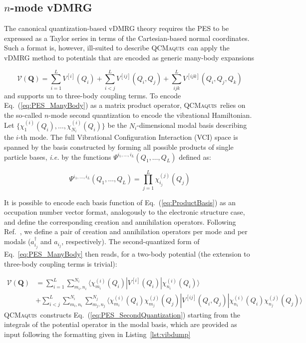 \documentclass[bibliography=totoc,12pt,a4paper]{scrartcl}
\newcommand{\qcm}{\textsc{QCMaquis}}
\begin{document}
\subsection{$n$-mode vDMRG}
\label{sec:nMode}

The canonical quantization-based vDMRG theory requires the PES to be expressed as a Taylor series in terms of the Cartesian-based normal coordinates.
Such a format is, however, ill-suited to describe
\qcm\ can apply the vDMRG method to potentials that are encoded as generic many-body expansions \cite{Bowman1997_ManyBody}

\begin{equation}
  \mathcal{V}(\bm{Q}) = \sum_{i=1}^L V^{[i]}(Q_i) + \sum_{i<j}^L V^{[ij]}(Q_i, Q_j)
    + \sum_{ijk}^L V^{[ijk]}(Q_i, Q_j, Q_k)
  \label{eq:PES_ManyBody}
\end{equation}
%
and supports un to three-body coupling terms.
To encode Eq.~(\ref{eq:PES_ManyBody}) as a matrix product operator, \qcm\ relies on the so-called $n$-mode second quantization \cite{Christiansen2004_nModeQuantization} to encode the vibrational Hamiltonian.
Let $\{ \chi_{1}^{(i)}(Q_i), \ldots, \chi_{N_i}^{(i)}(Q_i) \}$ be the $N_i$-dimensional modal basis describing the $i$-th mode.
The full Vibrational Configuration Interaction (VCI) space is spanned by the basis constructed by forming all possible products of single particle bases, \textit{i.e.} by the functions $\Psi^{i_1,\ldots,i_L}(Q_1,\ldots,Q_L)$ defined as:

\begin{equation}
  \Psi^{i_1,\ldots,i_L}(Q_1,\ldots,Q_L) = \prod_{j=1}^L \chi_{i_j}^{(j)}(Q_j)
  \label{eq:ProductBasis}
\end{equation}

It is possible to encode each basis function of Eq.~(\ref{eq:ProductBasis}) as an occupation number vector format, analogously to the electronic structure case, and define the corresponding creation and annihilation operators.
Following Ref.~, we define a pair of creation and annihilation operators per mode and per modals ($a_{i_j}^\dagger$ and $a_{i_j}$, respectively).
The second-quantized form of Eq.~\ref{eq:PES_ManyBody} then reads, for a two-body potential (the extension to three-body coupling terms is trivial):

\begin{equation}
 \begin{aligned}
  \mathcal{V}(\bm{Q}) &= \sum_{i=1}^L \sum_{m_i, n_i}^{N_i}
    \langle \chi_{m_i}^{(i)}(Q_i) | V^{[i]}(Q_i) | \chi_{n_i}^{(i)}(Q_i) \rangle \\
  &+ \sum_{i<j}^L \sum_{m_i, n_i}^{N_i} \sum_{m_j, n_j}^{N_j}
     \langle \chi_{m_i}^{(i)}(Q_i) \chi_{m_j}^{(j)}(Q_j) | V^{[ij]}(Q_i, Q_j) | 
             \chi_{n_i}^{(i)}(Q_i) \chi_{n_j}^{(j)}(Q_j) \rangle \,
 \end{aligned}
 \label{eq:PES_SecondQuantization}
\end{equation}
%
\qcm\ constructs Eq.~(\ref{eq:PES_SecondQuantization}) starting from the integrals of the potential operator in the modal basis, which are provided as input following the formatting given in Listing~\ref{lst:vibdump}
\end{document}
